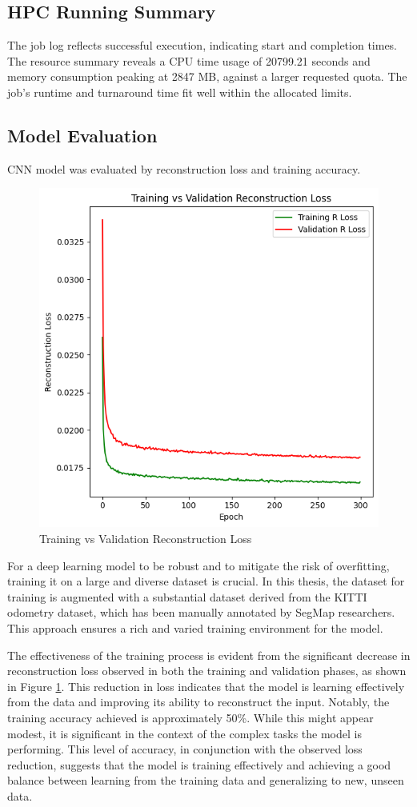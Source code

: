 \subsection{HPC Running Summary}
The job log reflects successful execution, indicating start and completion times. The resource summary reveals a CPU time usage of  20799.21 seconds and memory consumption peaking at 2847 MB, against a larger requested quota. The job's runtime and turnaround time fit well within the allocated limits.

\subsection{Model Evaluation}
CNN model was evaluated by reconstruction loss and training accuracy.
\begin{figure}[H]
    \centering
    \includegraphics[width=.6\linewidth]{Pictures/R_loss.png}
    \caption{Training vs Validation Reconstruction Loss}
    \label{fig:cnn_plot}
\end{figure}

For a deep learning model to be robust and to mitigate the risk of overfitting, training it on a large and diverse dataset is crucial. In this thesis, the dataset for training is augmented with a substantial dataset derived from the KITTI odometry dataset\cite{Geiger2012CVPR}, which has been manually annotated by SegMap researchers\cite{segmap}. This approach ensures a rich and varied training environment for the model.

The effectiveness of the training process is evident from the significant decrease in reconstruction loss observed in both the training and validation phases, as shown in Figure \ref{fig:cnn_plot}. This reduction in loss indicates that the model is learning effectively from the data and improving its ability to reconstruct the input. Notably, the training accuracy achieved is approximately 50\%. While this might appear modest, it is significant in the context of the complex tasks the model is performing. This level of accuracy, in conjunction with the observed loss reduction, suggests that the model is training effectively and achieving a good balance between learning from the training data and generalizing to new, unseen data.

